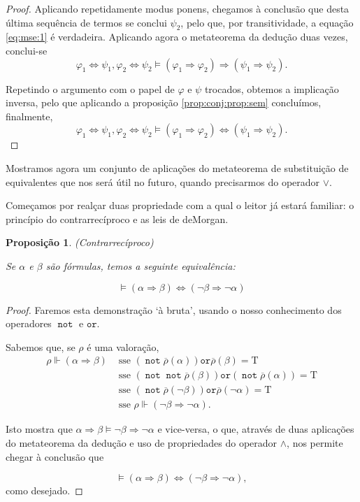 \documentclass{report}
\newtheorem{prop}{Proposição}
\theoremstyle{definition}
\theoremstyle{remark}
\newcommand{\lt}{\mathrm{T}}
\DeclareMathOperator{\pnot}{\texttt{not}}
\newcommand{\por}{\mathbin{\texttt{or}}}
\newcommand{\imply}{\mathbin{\Rightarrow}}
\newcommand{\eqv}{\mathbin{\Leftrightarrow}}
\begin{document}
\begin{proof}
	Aplicando repetidamente modus ponens, chegamos à conclusão que desta última sequência de termos se conclui $\psi_2$, pelo que, por transitividade, a equação \eqref{eq:mse:1} é verdadeira. Aplicando agora o metateorema da dedução duas vezes, conclui-se
	\[
	\varphi_1 \eqv \psi_1, \varphi_2 \eqv \psi_2  \vDash (\varphi_1 \imply \varphi_2) \imply (\psi_1 \imply \psi_2).
	\]
	
	Repetindo o argumento com o papel de $\varphi$ e $\psi$ trocados, obtemos a implicação inversa, pelo que aplicando a proposição \ref{prop:conj:prop:sem} concluímos, finalmente,
	\[
	\varphi_1 \eqv \psi_1, \varphi_2 \eqv \psi_2  \vDash (\varphi_1 \imply \varphi_2) \eqv (\psi_1 \imply \psi_2).
	\]
	\end{proof}
	
	Mostramos agora um conjunto de aplicações do metateorema de substituição de equivalentes que nos será útil no futuro, quando precisarmos do operador $\lor$.
	
	Começamos por realçar duas propriedade com a qual o leitor já estará familiar: o princípio do contrarrecíproco e as leis de deMorgan.
	
	\begin{prop}
	(Contrarrecíproco)
	
	Se $\alpha$ e $\beta$ são fórmulas, temos a seguinte equivalência:
	
	\begin{equation}
	\vDash (\alpha \imply \beta) \eqv (\neg \beta \imply \neg \alpha)
	\end{equation}
	\end{prop}
	
	\begin{proof}
	Faremos esta demonstração `à bruta', usando o nosso conhecimento dos operadores $\pnot$ e $\por$.
	
	Sabemos que, se $\rho$ é uma valoração,
	\begin{align*}
	\rho \Vdash (\alpha \imply \beta) &\text{ sse } (\pnot \overline\rho(\alpha)) \por \overline\rho(\beta) = \lt\\
	&\text{ sse } (\pnot \pnot \overline\rho(\beta)) \por (\pnot \overline\rho(\alpha)) = \lt\\
	&\text{ sse } (\pnot \overline\rho(\neg \beta)) \por \overline\rho(\neg \alpha) = \lt\\
	&\text{ sse } \rho \Vdash (\neg \beta \imply \neg \alpha).
	\end{align*}
	
	Isto mostra que $\alpha \imply \beta \vDash \neg \beta \imply \neg \alpha$ e vice-versa, o que, através de duas aplicações do metateorema da dedução e uso de propriedades do operador $\land$, nos permite chegar à conclusão que
	
	\begin{equation*}
	\vDash (\alpha \imply \beta) \eqv (\neg \beta \imply \neg \alpha),
	\end{equation*}
	como desejado.
	\end{proof}
	
\end{document}
